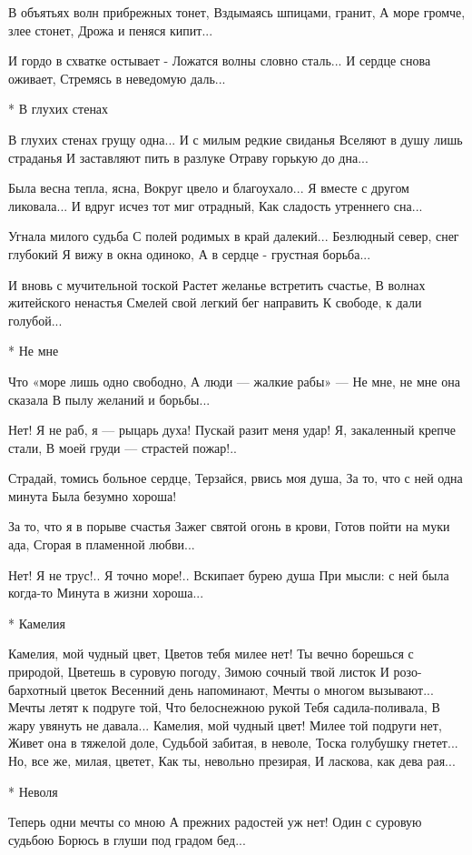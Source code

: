 В объятьях волн прибрежных тонет,
Вздымаясь шпицами, гранит,
А море громче, злее стонет,
Дрожа и пеняся кипит...

И гордо в схватке остывает -
Ложатся волны словно сталь...
И сердце снова оживает,
Стремясь в неведомую даль...


* В глухих стенах

В глухих стенах грущу одна...
И с милым редкие свиданья
Вселяют в душу лишь страданья
И заставляют пить в разлуке
Отраву горькую до дна...

Была весна тепла, ясна,
Вокруг цвело и благоухало...
Я вместе с другом ликовала...
И вдруг исчез тот миг отрадный,
Как сладость утреннего сна...

Угнала милого судьба
С полей родимых в край далекий...
Безлюдный север, снег глубокий
Я вижу в окна одиноко,
А в сердце - грустная борьба...

И вновь с мучительной тоской
Растет желанье встретить счастье,
В волнах житейского ненастья
Смелей свой легкий бег направить
К свободе, к дали голубой...


* Не мне

Что «море лишь одно свободно,
А люди — жалкие рабы» —
Не мне, не мне она сказала
В пылу желаний и борьбы...

Нет! Я не раб, я — рыцарь духа!
Пускай разит меня удар!
Я, закаленный крепче стали,
В моей груди — страстей пожар!..

Страдай, томись больное сердце,
Терзайся, рвись моя душа,
За то, что с ней одна минута
Была безумно хороша!

За то, что я в порыве счастья
Зажег святой огонь в крови,
Готов пойти на муки ада,
Сгорая в пламенной любви...

Нет! Я не трус!.. Я точно море!..
Вскипает бурею душа
При мысли: с ней была когда-то
Минута в жизни хороша...


* Камелия

Камелия, мой чудный цвет,
Цветов тебя милее нет!
Ты вечно борешься с природой,
Цветешь в суровую погоду,
Зимою сочный твой листок
И розо-бархотный цветок
Весенний день напоминают,
Мечты о многом вызывают...
Мечты летят к подруге той,
Что белоснежною рукой
Тебя садила-поливала,
В жару увянуть не давала...
Камелия, мой чудный цвет!
Милее той подруги нет,
Живет она в тяжелой доле,
Судьбой забитая, в неволе,
Тоска голубушку гнетет...
Но, все же, милая, цветет,
Как ты, невольно презирая,
И ласкова, как дева рая...


* Неволя

Теперь одни мечты со мною
А прежних радостей уж нет!
Один с суровую судьбою
Борюсь в глуши под градом бед...

